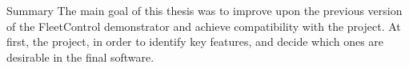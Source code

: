 \chap Summary
The main goal of this thesis was to improve upon the previous version of the FleetControl demonstrator and achieve compatibility with the {\mapfIR} project. 
At first, the {\mapfIR} project, in order to identify key features, and decide which ones are desirable in the final software. 

 
